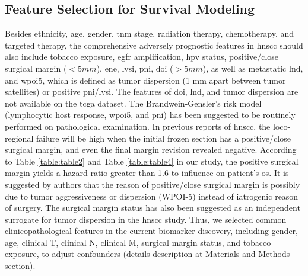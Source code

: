 \documentclass[jpm,article,submit,moreauthors,pdftex]{Definitions/mdpi}
\begin{document}
\begin{paracol}{2}
\subsection{Feature Selection for Survival Modeling} %
Besides ethnicity, age, gender, \acrshort{tnm} stage, radiation therapy, chemotherapy, and targeted therapy, the comprehensive adversely prognostic features in \acrshort{hnscc} should also include tobacco exposure, \acrshort{egfr} amplification, \acrfull{hpv} status, positive/close surgical margin ($<5 mm$), \acrfull{ene}, \acrfull{lvsi}, \acrfull{pni}, \acrfull{doi} ($>5 mm$), as well as metastatic \acrfull{lnd}\cite{Cheraghlou2018}, and \acrfull{wpoi5}, which is defined as tumor dispersion (1 mm apart between tumor satellites) or positive \acrshort{pni}/\acrshort{lvsi}\cite{Amin2017}.
The features of \acrshort{doi}, \acrshort{lnd}, and tumor dispersion are not available on the \acrshort{tcga} dataset. The Brandwein-Gensler's risk model (lymphocytic host response, \acrshort{wpoi5}, and \acrshort{pni})\cite{Brandwein-Gensler2010}\cite{Sinha2018} has been suggested to be routinely performed on pathological examination. In previous reports of \acrshort{hnscc}, the loco-regional failure will be high when the initial frozen section has a positive/close surgical margin, and even the final margin revision revealed negative\cite{Bulbul2019b}.
According to Table \ref{table:table2} and Table \ref{table:table4} in our study, the positive surgical margin yields a hazard ratio greater than 1.6 to influence on patient's \acrshort{os}.
It is suggested by authors \cite{Scholl1986}\cite{Sutton2003}\cite{Shaw2004}\cite{Guillemaud2010a}\cite{Patel2010}\cite{Kuriakose2017}\cite{Shapiro2017}\cite{Saidak2018}\cite{Miguelanez-Medran2019}\cite{Saidak2019} that the reason of positive/close surgical margin is possibly due to tumor aggressiveness or dispersion (WPOI-5) instead of iatrogenic reason of surgery. The surgical margin status has also been suggested as an independent surrogate for tumor dispersion in the \acrshort{hnscc} study. Thus, we selected common clinicopathological features in the current biomarker discovery, including gender, age, clinical T, clinical N, clinical M, surgical margin status, and tobacco exposure, to adjust confounders (details description at Materials and Methods section).




\end{paracol}
\end{document}
